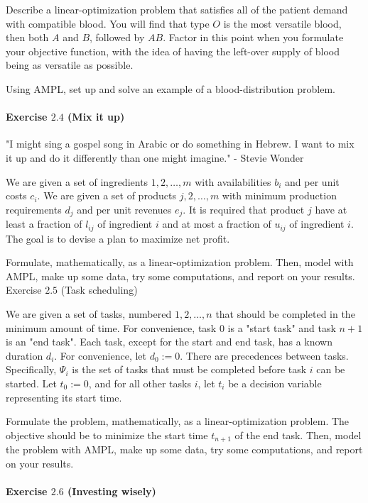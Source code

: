 Describe a linear-optimization problem that satisfies all of the patient demand with compatible blood. You will find that type $O$ is the most versatile blood, then both $A$ and $B$, followed by $A B$. Factor in this point when you formulate your objective function, with the idea of having the left-over supply of blood being as versatile as possible.

Using AMPL, set up and solve an example of a blood-distribution problem.

\paragraph{Exercise $2.4$ (Mix it up)}

"I might sing a gospel song in Arabic or do something in Hebrew. I want to mix it up and do it differently than one might imagine." - Stevie Wonder

We are given a set of ingredients $1,2, \ldots, m$ with availabilities $b_{i}$ and per unit costs $c_{i}$. We are given a set of products $j, 2, \ldots, m$ with minimum production requirements $d_{j}$ and per unit revenues $e_{j}$. It is required that product $j$ have at least a fraction of $l_{i j}$ of ingredient $i$ and at most a fraction of $u_{i j}$ of ingredient $i$. The goal is to devise a plan to maximize net profit.

Formulate, mathematically, as a linear-optimization problem. Then, model with AMPL, make up some data, try some computations, and report on your results. Exercise $2.5$ (Task scheduling)


We are given a set of tasks, numbered $1,2, \ldots, n$ that should be completed in the minimum amount of time. For convenience, task 0 is a "start task" and task $n+1$ is an "end task". Each task, except for the start and end task, has a known duration $d_{i}$. For convenience, let $d_{0}:=0$. There are precedences between tasks. Specifically, $\Psi_{i}$ is the set of tasks that must be completed before task $i$ can be started. Let $t_{0}:=0$, and for all other tasks $i$, let $t_{i}$ be a decision variable representing its start time.

Formulate the problem, mathematically, as a linear-optimization problem. The objective should be to minimize the start time $t_{n+1}$ of the end task. Then, model the problem with AMPL, make up some data, try some computations, and report on your results.

\paragraph{Exercise $2.6$ (Investing wisely)}

